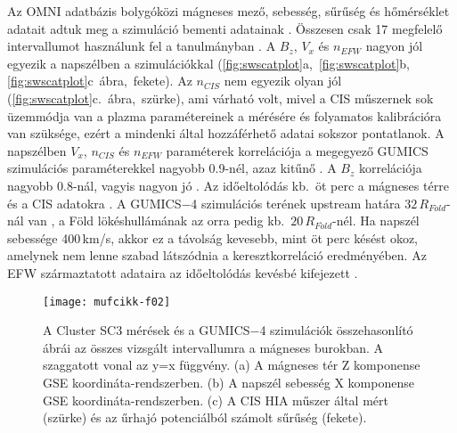 \documentclass[b5paper,10pt]{article}
\begin{document}
Az OMNI adatbázis bolygóközi mágneses mező, sebesség, sűrűség és hőmérséklet adatait adtuk meg a szimuláció bementi adatainak \cite{facsko16:_one_earth}. Összesen csak 17 megfelelő intervallumot használunk fel a tanulmányban \cite{facsko21:_compar_gumic_terres_magnet_clust_measur}. A $B_{z}$, $V_{x}$ és $n_{EFW}$ nagyon jól egyezik a napszélben a szimulációkkal (\ref{fig:swscatplot}a,~\ref{fig:swscatplot}b, \ref{fig:swscatplot}c~ábra,~fekete). Az $n_{CIS}$ nem egyezik olyan jól (\ref{fig:swscatplot}c.~ábra,~szürke), ami várható volt, mivel a CIS műszernek sok üzemmódja van a plazma paramétereinek a mérésére és folyamatos kalibrációra van szüksége, ezért a mindenki által hozzáférhető adatai sokszor pontatlanok. A napszélben $V_{x}$, $n_{CIS}$ és $n_{EFW}$ paraméterek korrelációja a megegyező GUMICS szimulációs paraméterekkel nagyobb 0.9-nél, azaz kitűnő \cite{facsko21:_compar_gumic_terres_magnet_clust_measur}. A $B_{z}$ korrelációja nagyobb 0.8-nál, vagyis nagyon jó \cite{facsko21:_compar_gumic_terres_magnet_clust_measur}. Az időeltolódás kb.~öt perc a mágneses térre és a CIS adatokra \cite{facsko21:_compar_gumic_terres_magnet_clust_measur}.  A GUMICS$-$4 szimulációs terének upstream határa $32\,R_{F\ddot{o}ld}$-nál van \cite{janhunen12:_gumic_mhd}, a Föld lökéshullámának az orra pedig kb.~$20\,R_{F\ddot{o}ld}$-nél. Ha napszél sebessége 400\,km/s, akkor ez a távolság kevesebb, mint öt perc késést okoz, amelynek nem lenne szabad látszódnia a keresztkorreláció eredményében. Az EFW származtatott adataira az időeltolódás kevésbé kifejezett \cite{facsko21:_compar_gumic_terres_magnet_clust_measur}.

\begin{figure}[!t]
\centering
\texttt{[image: mufcikk-f02]}
\caption{A Cluster SC3 mérések és a GUMICS$-$4 szimulációk összehasonlító ábrái az összes vizsgált intervallumra a mágneses burokban. A szaggatott vonal az y=x függvény. (a) A mágneses tér Z komponense GSE koordináta-rendszerben. (b) A napszél sebesség X komponense GSE koordináta-rendszerben. (c) A CIS HIA műszer által mért (szürke) és az űrhajó potenciálból számolt sűrűség (fekete).}
\label{fig:mshscatplot}
\end{figure}
\end{document}
